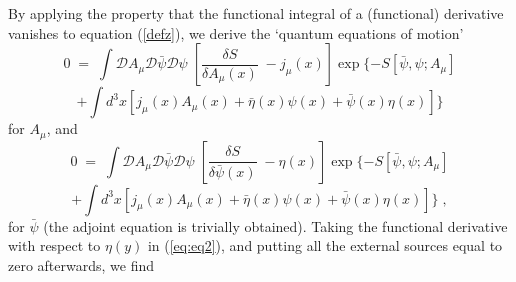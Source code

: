 \documentclass[a4paper,12pt]{article}
\begin{document}
By applying the property that the functional integral of a
(functional) derivative vanishes to equation (\ref{defz}), we derive
the `quantum equations of motion'
$$
0\;=\;\int {\mathcal D}A_\mu {\mathcal D}{\bar \psi} {\mathcal
  D}\psi \; \left[\frac{\delta S}{\delta A_\mu(x)}\; - j_\mu (x)
\right] \exp \{ - S[{\bar\psi},\psi; A_\mu]
$$
\begin{equation}
   \label{eq:eq1}
+ \int d^3x [j_\mu(x) A_\mu (x) + {\bar\eta}(x)\psi(x) +
{\bar\psi}(x)\eta(x)] \}
\end{equation}
for $A_\mu$, and
$$
0\;=\;\int {\mathcal D}A_\mu {\mathcal D}{\bar \psi} {\mathcal
  D}\psi \; \left[\frac{\delta S}{\delta {\bar \psi}(x)}\; - \eta(x)
\right] \exp \{ - S[{\bar\psi},\psi; A_\mu]
$$
\begin{equation}
   \label{eq:eq2}
+ \int d^3x [ j_\mu(x) A_\mu (x) + {\bar\eta}(x)\psi(x) +
{\bar\psi}(x)\eta(x) ] \} \;,
\end{equation}
for ${\bar\psi}$ (the adjoint equation is trivially obtained).  Taking
the functional derivative with respect to $\eta(y)$ in (\ref{eq:eq2}),
and putting all the external sources equal to zero afterwards, we find
\end{document}
